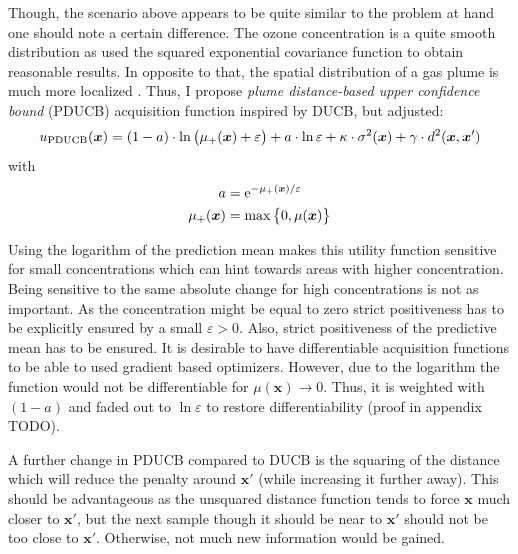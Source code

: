 \documentclass[11pt,a4paper]{scrreprt}
\newcommand{\vc}[1]{\bm{#1}}
\newcommand{\e}{\mathrm e}
\newcommand{\ped}[1]{_{\mathrm{#1}}}
\newcommand{\newterm}[1]{\emph{#1}}
\begin{document}
Though, the scenario above appears to be quite similar to the problem at hand 
one should note a certain difference. The ozone concentration is a quite smooth 
distribution as \textcite{Marchant:2012wb} used the squared exponential 
covariance function to obtain reasonable results. In opposite to that, the 
spatial distribution of a gas plume is much more localized \parencite[][this was 
also noted by]{Stachniss:2008vz}. Thus, I propose \newterm{plume distance-based 
    upper confidence bound} (PDUCB) acquisition function inspired by DUCB, but 
adjusted:
\begin{equation}
    u\ped{PDUCB}(\vc x) = \del{1 - a} \cdot \ln\del{\mu_+(\vc x) + \varepsilon} 
    + a \cdot \ln \varepsilon + \kappa \cdot \sigma^2(\vc x) + \gamma \cdot 
    d^2(\vc x, \vc x')
\end{equation}
with
\begin{align}
    a &= \e^{-\mu_+(\vc x) / \varepsilon} \\
    \mu_+(\vc x) &= \max\cbr{0, \mu(\vc x)}
\end{align}

Using the logarithm of the prediction mean makes this utility function sensitive 
for small concentrations which can hint towards areas with higher concentration.  
Being sensitive to the same absolute change for high concentrations is not as 
important. As the concentration might be equal to zero strict positiveness has 
to be explicitly ensured by a small $\varepsilon > 0$. Also, strict positiveness 
of the predictive mean has to be ensured. It is desirable to have differentiable 
acquisition functions to be able to used gradient based optimizers. However, due 
to the logarithm the function would not be differentiable for $\mu(\vc x) 
\rightarrow 0$. Thus, it is weighted with $(1 - a)$ and faded out to $\ln 
\varepsilon$ to restore differentiability (proof in appendix TODO).

A further change in PDUCB compared to DUCB is the squaring of the distance which 
will reduce the penalty around $\vc x'$ (while increasing it further away).  
This should be advantageous as the unsquared distance function tends to force 
$\vc x$ much closer to $\vc x'$, but the next sample though it should be near to 
$\vc x'$ should not be too close to $\vc x'$.  Otherwise, not much new 
information would be gained.
\end{document}

